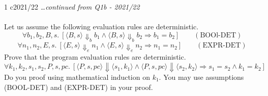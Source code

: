 \begin{exambox}{1 c}{2021/22}
	\textit{\dots continued from Q1b - 2021/22}
	\\
	\\ Let us assume the following evaluation rules are deterministic.
	\[\forall b_1, b_2, B, s . \ [\langle B, s \rangle \Downarrow_b b_1 \land \langle B, s \rangle \Downarrow_b b_2 \Rightarrow b_1 = b_2] \qquad (\text{BOOl-DET})\] 
	\[\forall n_1, n_2, E, s . \ [\langle E, s \rangle \Downarrow_e n_1 \land \langle E, s \rangle \Downarrow_e n_2 \Rightarrow n_1 = n_2] \qquad (\text{EXPR-DET})\]
	Prove that the program evaluation rules are deterministic.
	\[\forall k_1, k_2, s_1, s_2, P, s, pc . \ [\langle P, s, pc \rangle \Downarrow \langle s_1, k_1 \rangle \land \langle P, s, pc \rangle \Downarrow \langle s_2, k_2 \rangle \Rightarrow s_1 = s_2 \land k_1 = k_2] \]
	Do you proof using mathematical induction on $k_1$. You may use assumptions (BOOL-DET) and (EXPR-DET) in your proof.
\end{exambox}

